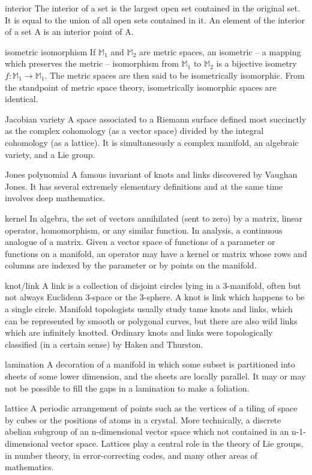 \begin{description}
\begin{tiny}
\item[interior] The interior of a set is the largest open set contained in the original set. It is equal to the union of all open sets contained in it. An element of the interior of a set $\mathrm{A}$ is an interior point of $\mathrm{A}$.
\item[isometric isomorphism] If $\mathbb{M}_{1}$ and $\mathbb{M}_{2}$ are metric spaces, an isometric -- a mapping which preserves the metric -- isomorphism from $\mathbb{M}_{1}$ to $\mathbb{M}_{2}$ is a bijective isometry $f : \mathbb{M}_{1} \rightarrow \mathbb{M}_{1}$. The metric spaces are then said to be isometrically isomorphic. From the standpoint of metric space theory, isometrically isomorphic spaces are identical.
\item[Jacobian variety] A space associated to a Riemann surface defined most succinctly as the complex cohomology (as a vector space) divided by the integral cohomology (as a lattice). It is simultaneously a complex manifold, an algebraic variety, and a Lie group.
\item[Jones polynomial] A famous invariant of knots and links discovered by Vaughan Jones. It has several extremely elementary definitions and at the same time involves deep mathematics.
\item[kernel] In algebra, the set of vectors annihilated (sent to zero) by a matrix, linear operator, homomorphism, or any similar function. In analysis, a continuous analogue of a matrix. Given a vector space of functions of a parameter or functions on a manifold, an operator may have a kernel or matrix whose rows and columns are indexed by the parameter or by points on the manifold.
\item[knot/link] A link is a collection of disjoint circles lying in a 3-manifold, often but not always Euclidean 3-space or the 3-sphere. A knot is link which happens to be a single circle. Manifold topologists usually study tame knots and links, which can be represented by smooth or polygonal curves, but there are also wild links which are infinitely knotted. Ordinary knots and links were topologically classified (in a certain sense) by Haken and Thurston.
\item[lamination] A decoration of a manifold in which some subset is partitioned into sheets of some lower dimension, and the sheets are locally parallel. It may or may not be possible to fill the gaps in a lamination to make a foliation.
\item[lattice] A periodic arrangement of points such as the vertices of a tiling of space by cubes or the positions of atoms in a crystal. More technically, a discrete abelian subgroup of an n-dimensional vector space which not contained in an n-1-dimensional vector space. Lattices play a central role in the theory of Lie groups, in number theory, in error-correcting codes, and many other areas of mathematics.

\end{tiny}
\end{description}
